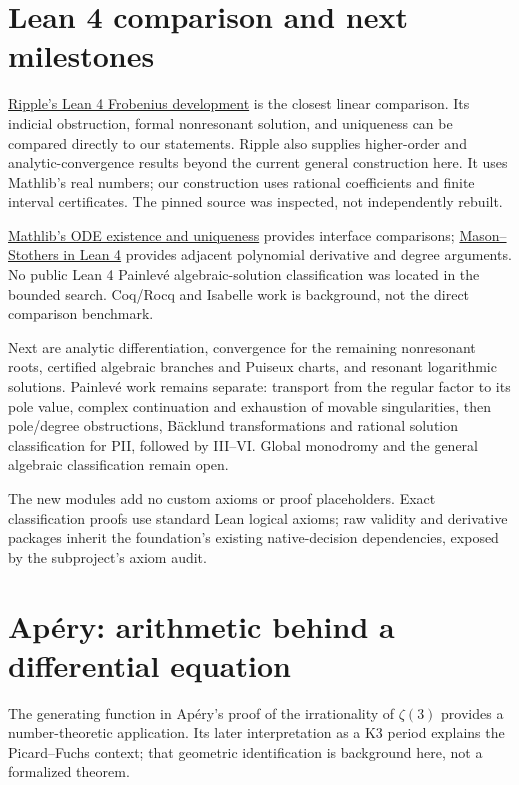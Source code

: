 \section{Lean 4 comparison and next milestones}

\href{https://github.com/zinan-huang/Ripple/tree/e9ce148d3975f9e75bb9724e01ec763ad9b368a9/Ripple/Number/Frobenius}
{Ripple's Lean 4 Frobenius development} is the closest linear comparison.
Its indicial obstruction, formal nonresonant solution, and uniqueness can be
compared directly to our statements. Ripple also supplies higher-order and
analytic-convergence results beyond the current general construction here.
It uses Mathlib's real numbers; our construction uses rational coefficients
and finite interval certificates. The pinned source was inspected, not
independently rebuilt.

\href{https://leanprover-community.github.io/mathlib4_docs/Mathlib/Analysis/ODE/ExistUnique.html}
{Mathlib's ODE existence and uniqueness} provides interface comparisons;
\href{https://github.com/seewoo5/lean-poly-abc}{Mason--Stothers in Lean 4}
provides adjacent polynomial derivative and degree arguments. No public Lean 4
Painlev\'e algebraic-solution classification was located in the bounded search.
Coq/Rocq and Isabelle work is background, not the direct comparison benchmark.

Next are analytic differentiation, convergence for the remaining nonresonant
roots, certified algebraic branches and
Puiseux charts, and resonant logarithmic solutions. Painlev\'e work remains
separate: transport from the regular factor to its pole value, complex
continuation and exhaustion of movable singularities, then pole/degree obstructions, B\"acklund transformations and rational
solution classification for PII, followed by III--VI. Global monodromy and
the general algebraic classification remain open.

The new modules add no custom axioms or proof placeholders. Exact
classification proofs use standard Lean logical axioms; raw validity and
derivative packages inherit the foundation's existing native-decision
dependencies, exposed by the subproject's axiom audit.

\section{Ap\'ery: arithmetic behind a differential equation}

The generating function in Ap\'ery's proof of the irrationality of
$\zeta(3)$ provides a number-theoretic application. Its later interpretation
as a K3 period explains the Picard--Fuchs context; that geometric
identification is background here, not a formalized theorem.

